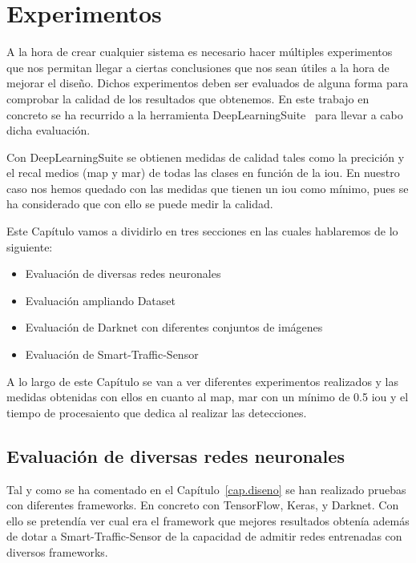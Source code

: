\chapter{Experimentos}\label{cap.experimentos}

A la hora de crear cualquier sistema es necesario hacer múltiples experimentos que nos permitan llegar a ciertas conclusiones que nos sean útiles a la hora de mejorar el diseño. Dichos experimentos deben ser evaluados de alguna forma para comprobar la calidad de los resultados que obtenemos. En este trabajo en concreto se ha recurrido a la herramienta DeepLearningSuite~\cite{detectionsuite} para llevar a cabo dicha evaluación.

Con DeepLearningSuite se obtienen medidas de calidad tales como la precición y el recal medios (\acrshort{map} y \acrshort{mar}) de todas las clases en función de la \acrfull{iou}. En nuestro caso nos hemos quedado con las medidas que tienen un \acrshort{iou} como mínimo, pues se ha considerado que con ello se puede medir la calidad.

Este Capítulo vamos a dividirlo en tres secciones en las cuales hablaremos de lo siguiente:
\begin{itemize}
    \item Evaluación de diversas redes neuronales
    \item Evaluación ampliando Dataset
    \item Evaluación de Darknet con diferentes conjuntos  de imágenes
    \item Evaluación de Smart-Traffic-Sensor
\end{itemize}

A lo largo de este Capítulo se van a ver diferentes experimentos realizados y las medidas obtenidas con ellos en cuanto al \acrfull{map}, \acrfull{mar} con un mínimo de 0.5 \acrshort{iou} y el tiempo de procesaiento que dedica al realizar las detecciones.

\section{Evaluación de diversas redes neuronales}
 
Tal y como se ha comentado en el Capítulo~\ref{cap.diseno} se han realizado pruebas con diferentes frameworks. En concreto con TensorFlow, Keras, y Darknet. Con ello se pretendía ver cual era el framework que mejores resultados obtenía además de dotar a Smart-Traffic-Sensor de la capacidad de admitir redes entrenadas con diversos frameworks.


